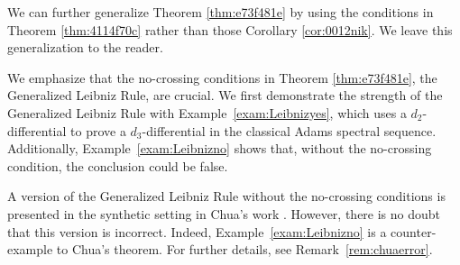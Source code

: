 \documentclass{amsart}
\numberwithin{equation}{section}
\begin{document}
\begin{remark}
    We can further generalize Theorem \ref{thm:e73f481e} by using the conditions in Theorem \ref{thm:4114f70c} rather than those Corollary \ref{cor:0012nik}. We leave this generalization to the reader.
\end{remark}

We emphasize that the no-crossing conditions in Theorem \ref{thm:e73f481e}, the Generalized Leibniz Rule, are crucial. We first demonstrate the strength of the Generalized Leibniz Rule with Example~\ref{exam:Leibnizyes}, which uses a $d_2$-differential to prove a $d_3$-differential in the classical Adams spectral sequence. Additionally, Example~\ref{exam:Leibnizno} shows that, without the no-crossing condition, the conclusion could be false.

\begin{remark}
    A version of the Generalized Leibniz Rule without the no-crossing conditions is presented in the synthetic setting in Chua's work \cite[Theorem~12.9]{Chua}. However, there is no doubt that this version is incorrect. Indeed, Example~\ref{exam:Leibnizno} is a counter-example to Chua's theorem. For further details, see Remark~\ref{rem:chuaerror}.
\end{remark}
\end{document}

